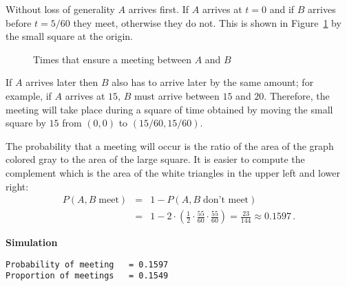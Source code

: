 Without loss of generality $A$ arrives first. If $A$ arrives at $t=0$ and if $B$ arrives before $t=5/60$ they meet, otherwise they do not. This is shown in Figure~\ref{f.duel} by the small square at the origin.
\begin{figure}[tb]
\begin{center}
\end{center}
\caption{Times that ensure a meeting between $A$ and $B$}\label{f.duel}
\end{figure}
If $A$ arrives later then $B$ also has to arrive later by the same amount; for example, if $A$ arrives at $15$, $B$ must arrive between $15$ and $20$. Therefore, the meeting will take place during a square of time obtained by moving the small square by $15$ from $(0,0)$ to $(15/60,15/60)$.

The probability that a meeting will occur is the ratio of the area of the graph colored gray to the area of the large square. It is easier to compute the complement which is the area of the white triangles in the upper left and lower right:
\begin{eqnarray*}
P(A,B\;\textrm{meet}) &=& 1- P(A,B\;\textrm{don't meet})\\
&=&1- 2\cdot \left(\frac{1}{2}\cdot \frac{55}{60}\cdot \frac{55}{60}\right)=\frac{23}{144}\approx 0.1597\,.
\end{eqnarray*}

\textbf{Simulation}
\begin{verbatim}
Probability of meeting   = 0.1597
Proportion of meetings   = 0.1549
\end{verbatim}


